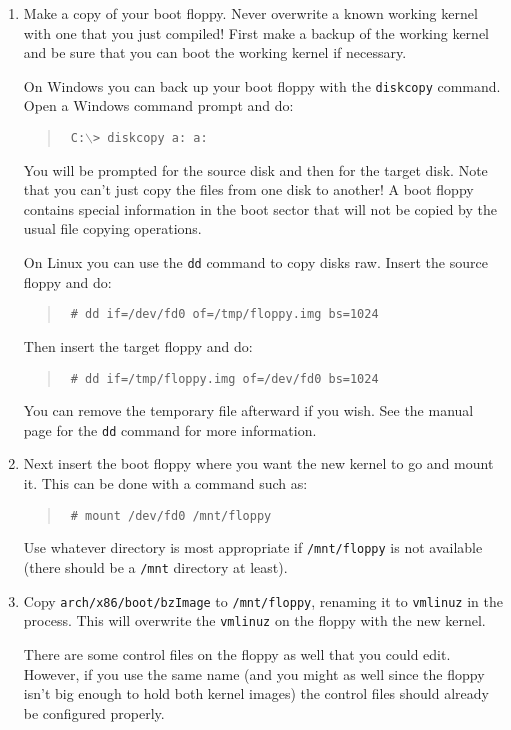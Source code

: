 \documentclass{article}
\newcommand{\command}[1]{\texttt{#1}}
\newcommand{\filename}[1]{\texttt{#1}}
\newenvironment{commands}
  {\begin{quote} \tt}
  {\end{quote}}
\begin{document}
\begin{enumerate}

\item Make a copy of your boot floppy. Never overwrite a known working kernel with one that you
  just compiled! First make a backup of the working kernel and be sure that you can boot the
  working kernel if necessary.

  On Windows you can back up your boot floppy with the \command{diskcopy} command. Open a
  Windows command prompt and do:
  \begin{commands}
    C:$\backslash$> diskcopy a: a:
  \end{commands}

  You will be prompted for the source disk and then for the target disk. Note that you can't
  just copy the files from one disk to another! A boot floppy contains special information in
  the boot sector that will not be copied by the usual file copying operations.

  On Linux you can use the \command{dd} command to copy disks raw. Insert the source floppy and
  do:
  \begin{commands}
    \# dd if=/dev/fd0 of=/tmp/floppy.img bs=1024
  \end{commands}

  Then insert the target floppy and do:
  \begin{commands}
    \# dd if=/tmp/floppy.img of=/dev/fd0 bs=1024
  \end{commands}

  You can remove the temporary file afterward if you wish. See the manual page for the
  \command{dd} command for more information.

\item Next insert the boot floppy where you want the new kernel to go and mount it. This can be
  done with a command such as:
  \begin{commands}
    \# mount /dev/fd0 /mnt/floppy
  \end{commands}

  Use whatever directory is most appropriate if \filename{/mnt/floppy} is not available (there
  should be a \filename{/mnt} directory at least).

\item Copy \filename{arch/x86/boot/bzImage} to \filename{/mnt/floppy}, renaming it to
  \filename{vmlinuz} in the process. This will overwrite the \filename{vmlinuz} on the floppy
  with the new kernel.

  There are some control files on the floppy as well that you could edit. However, if you use
  the same name (and you might as well since the floppy isn't big enough to hold both kernel
  images) the control files should already be configured properly.


\end{enumerate}
\end{document}
